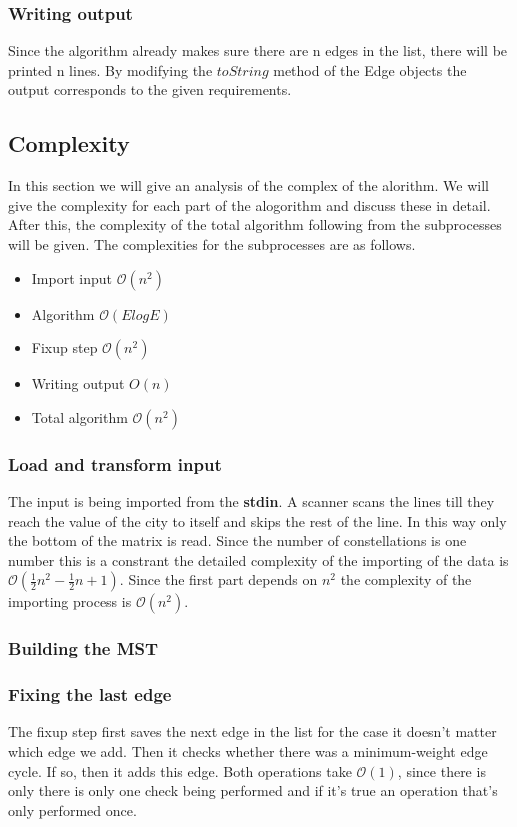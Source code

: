 \documentclass{article}
\newcommand{\bigO}[1]{\mathcal{O}(#1)}
\begin{document}
\subsubsection{Writing output}
Since the algorithm already makes sure there are n edges in the list, there will be printed n lines. By modifying the $toString$ method of the Edge objects the output corresponds to the given requirements.

\subsection{Complexity}
In this section we will give an analysis of the complex of the alorithm. We will give the complexity for each part of the alogorithm and discuss these in detail. After this, the complexity of the total algorithm following from the subprocesses will be given. The complexities for the subprocesses are as follows.
\begin{itemize}
  \item Import input $\bigO{n^2}$
  \item Algorithm $\bigO{E log E}$
  \item Fixup step $\bigO{n^2}$
  \item Writing output $O(n)$
  \item Total algorithm $\bigO{n^2}$
\end{itemize}

\subsubsection{Load and transform input}
The input is being imported from the \textbf{stdin}. A scanner scans the lines till they reach the value of the city to itself and skips the rest of the line. In this way only the bottom of the matrix is read. Since the number of constellations is one number this is a constrant the detailed complexity of the importing of the data is $\bigO{\frac{1}{2}n^2 - \frac{1}{2}n + 1}$. Since the first part depends on $n^2$ the complexity of the importing process is $\bigO{n^2}$.

\subsubsection{Building the MST}

\subsubsection{Fixing the last edge}
The fixup step first saves the next edge in the list for the case it doesn't matter which edge we add. Then it checks whether there was a minimum-weight edge cycle. If so, then it adds this edge. Both operations take $\bigO{1}$, since there is only there is only one check being performed and if it's true an operation that's only performed once.
\end{document}
